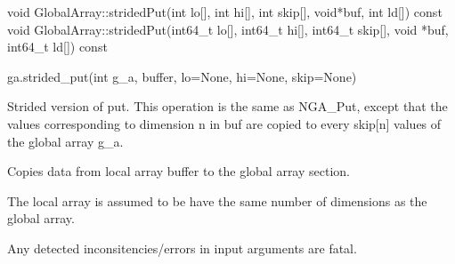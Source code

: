 \documentclass[10pt]{article}
\begin{document}
\begin{cxxapi}
\begin{cxxcode}
void GlobalArray::stridedPut(int lo[], int hi[], int skip[],
                             void*buf, int ld[]) const
void GlobalArray::stridedPut(int64_t lo[], int64_t hi[], int64_t skip[],
                             void *buf, int64_t ld[]) const
\end{cxxcode}
\begin{funcargs}
\end{funcargs}
\end{cxxapi}

\begin{pyapi}
\begin{pycode}
ga.strided_put(int g_a, buffer, lo=None, hi=None, skip=None)
\end{pycode}
\begin{funcargs}
\end{funcargs}
\end{pyapi}

\ncoll

\begin{desc}

Strided version of put.  This operation is the same as NGA_Put, except that the
values corresponding to dimension n in buf are copied to every skip[n] values
of the global array g_a.

Copies data from local array buffer to the global array section.

The local array is assumed to be have the same number of dimensions as the
global array.

Any detected inconsitencies/errors in input arguments are fatal.

\end{desc}


\end{document}
